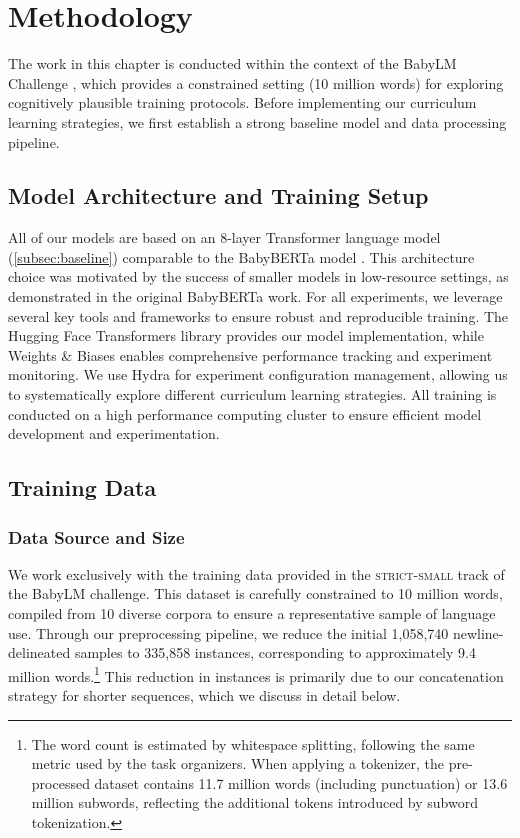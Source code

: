 \section{Methodology}

The work in this chapter is conducted within the context of the BabyLM Challenge \citep{warstadt2023babylm1}, which provides a constrained setting (10 million words) for exploring cognitively plausible training protocols. Before implementing our curriculum learning strategies, we first establish a strong baseline model and data processing pipeline. 

\subsection{Model Architecture and Training Setup}
All of our models are based on an 8-layer Transformer language model (\cref{subsec:baseline}) comparable to the BabyBERTa model \cite{huebner2021babyberta}. This architecture choice was motivated by the success of smaller models in low-resource settings, as demonstrated in the original BabyBERTa work. For all experiments, we leverage several key tools and frameworks to ensure robust and reproducible training. The Hugging Face Transformers library \cite{transformers} provides our model implementation, while Weights \& Biases \cite{wandb} enables comprehensive performance tracking and experiment monitoring. We use Hydra \cite{hydra} for experiment configuration management, allowing us to systematically explore different curriculum learning strategies. All training is conducted on a high performance computing cluster to ensure efficient model development and experimentation.

\subsection{Training Data}
\label{subsec:data}

\subsubsection{Data Source and Size}
We work exclusively with the training data provided in the \textsc{strict-small} track of the BabyLM challenge. This dataset is carefully constrained to 10 million words, compiled from 10 diverse corpora to ensure a representative sample of language use. Through our preprocessing pipeline, we reduce the initial 1,058,740 newline-delineated samples to 335,858 instances, corresponding to approximately 9.4 million words.\footnote{The word count is estimated by whitespace splitting, following the same metric used by the task organizers. When applying a tokenizer, the pre-processed dataset contains 11.7 million words (including punctuation) or 13.6 million subwords, reflecting the additional tokens introduced by subword tokenization.} This reduction in instances is primarily due to our concatenation strategy for shorter sequences, which we discuss in detail below.

